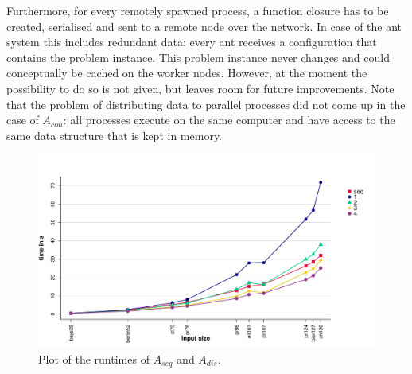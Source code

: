 Furthermore, for every remotely spawned process, a function closure has to be created, serialised and sent to a remote node over the network. In case of the ant system this includes redundant data: every ant receives a configuration that contains the problem instance. This problem instance never changes and could conceptually be cached on the worker nodes. However, at the moment the possibility to do so is not given, but leaves room for future improvements. Note that the problem of distributing data to parallel processes did not come up in the case of $A_{con}$: all processes execute on the same computer and have access to the same data structure that is kept in memory.

\begin{figure}[h!]
  \centering
  \includegraphics[width=\textwidth]{img/test_distributed_1.pdf}
  \caption{Plot of the runtimes of $A_{seq}$ and $A_{dis}.$}
  \label{fig:test_distributed}
\end{figure}